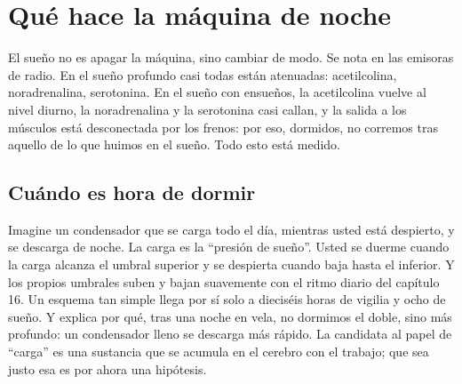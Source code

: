 \chapter{Qué hace la máquina de noche}

El sueño no es apagar la máquina, sino cambiar de modo. Se nota en las emisoras de radio. En el sueño profundo casi todas están atenuadas: acetilcolina, noradrenalina, serotonina. En el sueño con ensueños, la acetilcolina vuelve al nivel diurno, la noradrenalina y la serotonina casi callan, y la salida a los músculos está desconectada por los frenos: por eso, dormidos, no corremos tras aquello de lo que huimos en el sueño. Todo esto está medido.

\section*{Cuándo es hora de dormir}

Imagine un condensador que se carga todo el día, mientras usted está despierto, y se descarga de noche. La carga es la “presión de sueño”. Usted se duerme cuando la carga alcanza el umbral superior y se despierta cuando baja hasta el inferior. Y los propios umbrales suben y bajan suavemente con el ritmo diario del capítulo 16. Un esquema tan simple llega por sí solo a dieciséis horas de vigilia y ocho de sueño. Y explica por qué, tras una noche en vela, no dormimos el doble, sino más profundo: un condensador lleno se descarga más rápido. La candidata al papel de “carga” es una sustancia que se acumula en el cerebro con el trabajo; que sea justo esa es por ahora una hipótesis.



